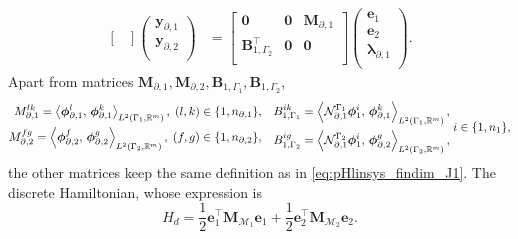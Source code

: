 \begin{equation}
\begin{aligned}
\begin{bmatrix}
\end{bmatrix}
\begin{pmatrix}
\mathbf{y}_{\partial, 1} \\
\mathbf{y}_{\partial, 2} \\
\end{pmatrix}
&= \begin{bmatrix}
\mathbf{0} & \mathbf{0} & \mathbf{M}_{\partial, 1} \\
\mathbf{B}_{1, \Gamma_2}^\top & \mathbf{0} & \mathbf{0} \\
\end{bmatrix}\begin{pmatrix}
\mathbf{e}_{1} \\
\mathbf{e}_{2} \\
{\bm{\lambda}}_{\partial, 1} \\
\end{pmatrix}.
\end{aligned}
\end{equation}
Apart from matrices $\mathbf{M}_{\partial, 1}, \mathbf{M}_{\partial, 2}, \mathbf{B}_{1, \Gamma_1}, \mathbf{B}_{1, \Gamma_2}$,
\begin{equation}
\begin{aligned}
{M}_{\partial, 1}^{lk} = \inner[L^2(\Gamma_1, \mathbb{R}^m)]{\bm{\phi}_{\partial, 1}^l}{\bm{\phi}_{\partial, 1}^k}, \; (l,k) \in \{1,n_{\partial, 1}\}, \\
{M}_{\partial, 2}^{fg} = \inner[L^2(\Gamma_2, \mathbb{R}^m)]{\bm{\phi}_{\partial, 2}^f}{\bm{\phi}_{\partial, 2}^g}, \; (f,g) \in \{1,n_{\partial, 2}\},\\
\end{aligned}  \quad
\begin{aligned}
{B}_{1, \Gamma_1}^{ik} = \inner[L^2(\Gamma_1, \mathbb{R}^m)]{\mathcal{N}_{\partial, 1}^{\Gamma_1}\bm{\phi}_{1}^i}{\bm{\phi}_{\partial, 1}^k}, \\
{B}_{1, \Gamma_2}^{ig} = \inner[L^2(\Gamma_2, \mathbb{R}^m)]{\mathcal{N}_{\partial, 1}^{\Gamma_2}\bm{\phi}_{1}^i}{\bm{\phi}_{\partial, 2}^g}, \\
\end{aligned} \; i \in \{1,n_1\},
\end{equation} 
the other matrices keep the same definition as in \eqref{eq:pHlinsys_findim_J1}. The discrete Hamiltonian, whose expression is \cite{beattie2018linear}
\begin{equation}
H_d = \frac{1}{2} \mathbf{e}_1^\top \mathbf{M}_{\mathcal{M}_1} \mathbf{e}_1 + \frac{1}{2} \mathbf{e}_2^\top \mathbf{M}_{\mathcal{M}_2} \mathbf{e}_2.
\end{equation}
